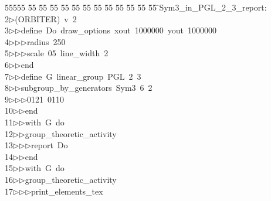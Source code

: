 %
%
\begin{tabbing}
55555 \= 55 \= 55 \= 55 \= 55 \= 55 \= 55 \= 55 \= 55 \= 55 \= 55 \= 55 \= 55 \= \>Sym3\_in\_PGL\_2\_3\_report:\\[0pt]
2\>$\triangleright$\>(ORBITER)\ v\ 2\ \\[0pt]
3\>$\triangleright$\>$\triangleright$\>define\ Do\ draw\_options\ xout\ 1000000\ yout\ 1000000\ \\[0pt]
4\>$\triangleright$\>$\triangleright$\>$\triangleright$\>radius\ 250\ \\[0pt]
5\>$\triangleright$\>$\triangleright$\>$\triangleright$\>scale\ 05\ line\_width\ 2\ \\[0pt]
6\>$\triangleright$\>$\triangleright$\>end\ \\[0pt]
7\>$\triangleright$\>$\triangleright$\>define\ G\ linear\_group\ PGL\ 2\ 3\ \\[0pt]
8\>$\triangleright$\>$\triangleright$\>subgroup\_by\_generators\ Sym3\ 6\ 2\ \\[0pt]
9\>$\triangleright$\>$\triangleright$\>$\triangleright$\>0121\ 0110\ \\[0pt]
10\>$\triangleright$\>$\triangleright$\>end\ \\[0pt]
11\>$\triangleright$\>$\triangleright$\>with\ G\ do\ \\[0pt]
12\>$\triangleright$\>$\triangleright$\>group\_theoretic\_activity\ \\[0pt]
13\>$\triangleright$\>$\triangleright$\>$\triangleright$\>report\ Do\ \\[0pt]
14\>$\triangleright$\>$\triangleright$\>end\ \\[0pt]
15\>$\triangleright$\>$\triangleright$\>with\ G\ do\ \\[0pt]
16\>$\triangleright$\>$\triangleright$\>group\_theoretic\_activity\ \\[0pt]
17\>$\triangleright$\>$\triangleright$\>$\triangleright$\>print\_elements\_tex\ \\[0pt]

\end{tabbing}
